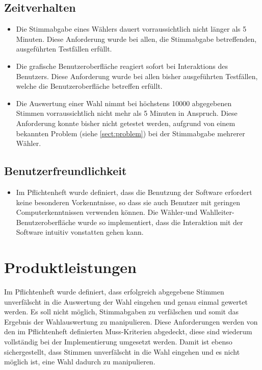 \documentclass[parskip=full]{scrartcl}
\begin{document}
\subsection{Zeitverhalten}

\begin{itemize}
	\item Die Stimmabgabe eines Wählers dauert vorraussichtlich nicht länger als 5 Minuten. Diese Anforderung wurde bei allen, die Stimmabgabe betreffenden, ausgeführten Testfällen erfüllt.
	\item Die grafische Benutzeroberfläche reagiert sofort bei Interaktions des Benutzers. Diese Anforderung wurde bei allen bisher ausgeführten Testfällen, welche die Benutzeroberfläche betreffen erfüllt.
	\item Die Auswertung einer Wahl nimmt bei höchstens 10000 abgegebenen Stimmen vorraussichtlich nicht mehr als 5 Minuten in Anspruch. Diese Anforderung konnte bisher nicht getestet werden, aufgrund von einem bekannten Problem (siehe \autoref{sect:problem}) bei der Stimmabgabe mehrerer Wähler.
\end{itemize}

\subsection{Benutzerfreundlichkeit}
\begin{itemize}
	\item Im Pflichtenheft wurde definiert, dass die Benutzung der Software erfordert keine besonderen Vorkenntnisse, so dass sie auch Benutzer mit geringen Computerkenntnissen verwenden können. Die Wähler-und Wahlleiter-Benutzeroberfläche wurde so implementiert, dass die Interaktion mit der Software intuitiv vonstatten gehen kann.
\end{itemize}

\section{Produktleistungen}
Im Pflichtenheft wurde definiert, dass erfolgreich abgegebene Stimmen unverfälscht in die Auswertung der Wahl eingehen und genau einmal gewertet werden. Es soll nicht möglich, Stimmabgaben zu verfälschen und somit das Ergebnis der Wahlauswertung zu manipulieren.
Diese Anforderungen werden von den im Pflichtenheft definierten Muss-Kriterien abgedeckt, diese sind wiederum vollständig bei der Implementierung umgesetzt werden. Damit ist ebenso sichergestellt, dass Stimmen unverfälscht in die Wahl eingehen und es nicht möglich ist, eine Wahl dadurch zu manipulieren.
\end{document}
